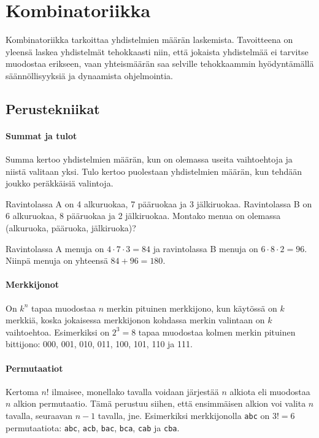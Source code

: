 \chapter{Kombinatoriikka}

Kombinatoriikka tarkoittaa yhdistelmien määrän laskemista.
Tavoitteena on yleensä laskea yhdistelmät
tehokkaasti niin, että jokaista yhdistelmää
ei tarvitse muodostaa erikseen, vaan yhteismäärän
saa selville tehokkaammin hyödyntämällä säännöllisyyksiä ja
dynaamista ohjelmointia.

\section{Perustekniikat}

\subsubsection{Summat ja tulot}

Summa kertoo yhdistelmien määrän,
kun on olemassa useita vaihtoehtoja
ja niistä valitaan yksi.
Tulo kertoo puolestaan yhdistelmien määrän,
kun tehdään joukko peräkkäisiä valintoja.

\begin{task}
Ravintolassa A on 4 alkuruokaa,
7 pääruokaa ja 3 jälkiruokaa.
Ravintolassa B on 6 alkuruokaa,
8 pääruokaa ja 2 jälkiruokaa.
Montako menua on olemassa (alkuruoka, pääruoka, jälkiruoka)?
\end{task}

Ravintolassa A menuja on $4 \cdot 7 \cdot 3 = 84$
ja ravintolassa B menuja on $6 \cdot 8 \cdot 2 = 96$.
Niinpä menuja on yhteensä $84+96=180$.

\subsubsection{Merkkijonot}

On $k^n$ tapaa muodostaa $n$ merkin pituinen merkkijono,
kun käytössä on $k$ merkkiä,
koska jokaisessa merkkijonon kohdassa merkin valintaan
on $k$ vaihtoehtoa.
Esimerkiksi on $2^3=8$ tapaa muodostaa kolmen merkin pituinen
bittijono:
000, 001, 010, 011, 100, 101, 110 ja 111.

\subsubsection{Permutaatiot}

Kertoma $n!$ ilmaisee, monellako tavalla voidaan
järjestää $n$ alkiota
eli muodostaa $n$ alkion permutaatio.
Tämä perustuu siihen, että ensimmäisen
alkion voi valita $n$ tavalla,
seuraavan $n-1$ tavalla, jne.
Esimerkiksi merkkijonolla \texttt{abc} on
$3!=6$ permutaatiota:
\texttt{abc},
\texttt{acb},
\texttt{bac},
\texttt{bca},
\texttt{cab} ja
\texttt{cba}.

